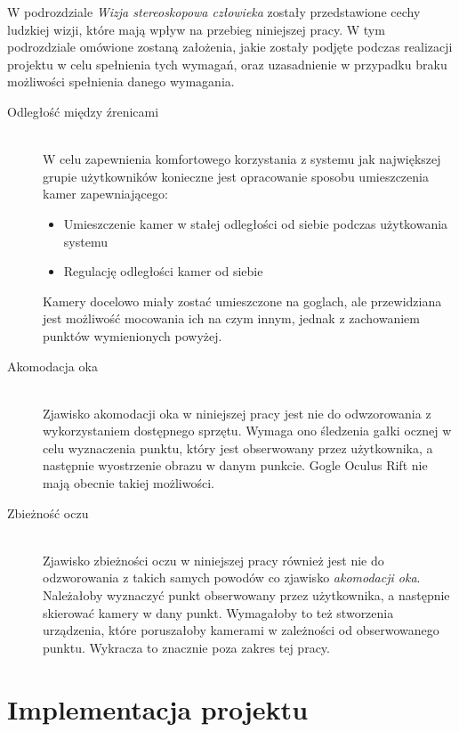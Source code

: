 \documentclass[a4paper,11pt,twoside]{report}
\theoremstyle{definition}
\begin{document}
W podrozdziale \textit{Wizja stereoskopowa człowieka} zostały przedstawione cechy ludzkiej wizji, które mają wpływ na przebieg niniejszej pracy. W tym podrozdziale omówione zostaną założenia, jakie zostały podjęte podczas realizacji projektu w celu spełnienia tych wymagań, oraz uzasadnienie w przypadku braku możliwości spełnienia danego wymagania.

\begin{description}

\item[Odległość między źrenicami] \hfill \\
W celu zapewnienia komfortowego korzystania z systemu jak największej grupie użytkowników konieczne jest opracowanie sposobu umieszczenia kamer zapewniającego:
\begin{itemize}
\item Umieszczenie kamer w stałej odległości od siebie podczas użytkowania systemu
\item Regulację odległości kamer od siebie
\end{itemize}

Kamery docelowo miały zostać umieszczone na goglach, ale przewidziana jest możliwość mocowania ich na czym innym, jednak z zachowaniem punktów wymienionych powyżej.

\item [Akomodacja oka] \hfill \\
Zjawisko akomodacji oka w niniejszej pracy jest nie do odwzorowania z wykorzystaniem dostępnego sprzętu. Wymaga ono śledzenia gałki ocznej w celu wyznaczenia punktu, który jest obserwowany przez użytkownika, a następnie wyostrzenie obrazu w danym punkcie. Gogle Oculus Rift nie mają obecnie takiej możliwości.

\item[Zbieżność oczu] \hfill \\
Zjawisko zbieżności oczu w niniejszej pracy również jest nie do odzworowania z takich samych powodów co zjawisko \textit{akomodacji oka}. Należałoby wyznaczyć punkt obserwowany przez użytkownika, a następnie skierować kamery w dany punkt. Wymagałoby to też stworzenia urządzenia, które poruszałoby kamerami w zależności od obserwowanego punktu. Wykracza to znacznie poza zakres tej pracy.

\end{description}

\chapter{Implementacja projektu}
\end{document}
